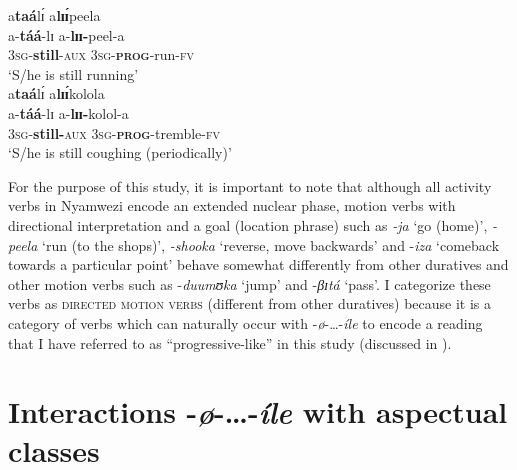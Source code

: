 \documentclass[output=paper,newtxmath,modfonts,nonflat,draftmode]{langsci/langscibook}
\begin{document}
\ea \label{ex:kanijo:14}
\ea \label{ex:kanijo:14a}
\glll a\textbf{taá}lɪ́ a\textbf{lɪɪ́}peela\\ 
a-\textbf{táá}-lɪ  a-\textbf{lɪɪ}\textbf{-}peel-a\\
\textsc{3sg}-\textbf{still}-\textsc{aux} \textsc{3sg}-\textbf{\textsc{prog}}-run-\textsc{fv}\\ 
\glt ‘S/he is still running’\\
\ex \label{ex:kanijo:14b}
\glll a\textbf{taá}lɪ́      a\textbf{l}\textbf{ɪɪ́}kolola\\
a-\textbf{táá}-lɪ            a-\textbf{lɪɪ-}kolol-a\\  
\textsc{3sg}-\textbf{still-}\textsc{aux} \textsc{3sg}-\textbf{\textsc{prog}}-tremble-\textsc{fv}\\
\glt ‘S/he is still coughing (periodically)’\\  
\z
\z

For the purpose of this study, it is important to note that although all activity verbs in Nyamwezi encode an extended nuclear phase, motion verbs with directional interpretation and a goal (location phrase) such as \textit{-ja} ‘go (home)’, \textit{-peela} ‘run (to the shops)’, \textit{-shooka} ‘reverse, move backwards’ and -\textit{iza} ‘comeback towards a particular point’ behave somewhat differently from other duratives and other motion verbs such as -\textit{duumʊka} ‘jump’ and -\textit{βɪtá} ‘pass’. I categorize these verbs as \textsc{directed motion verbs} (different from other duratives) because it is a category of verbs which can naturally occur with -\textit{ø}-…-\textit{íle} to encode a reading that I have referred to as ``progressive-like'' in this study (discussed in ).

\section{Interactions -\textit{ø}-…-\textit{íle} with aspectual classes}\label{sec:kanijo:4}
\end{document}
